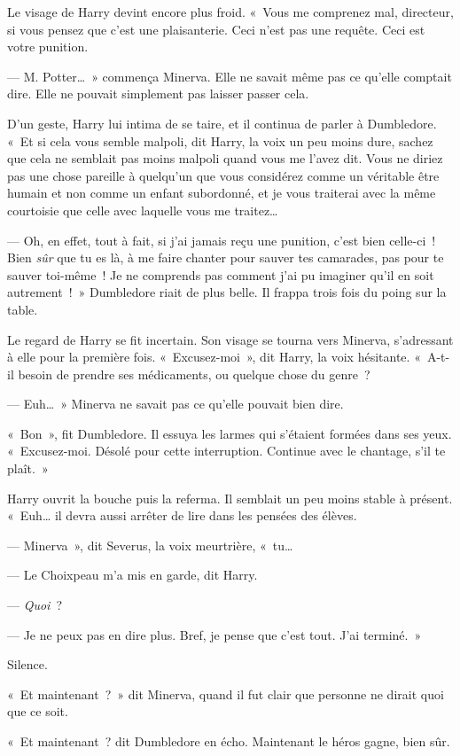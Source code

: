 Le visage de Harry devint encore plus froid.
«~Vous me comprenez mal, directeur, si vous pensez que c'est une plaisanterie.
Ceci n'est pas une requête.
Ceci est votre punition.

--- M. Potter…~»
commença Minerva.
Elle ne savait même pas ce qu'elle comptait dire.
Elle ne pouvait simplement pas laisser passer cela.

D'un geste, Harry lui intima de se taire, et il continua de parler à Dumbledore.
«~Et si cela vous semble malpoli, dit Harry, la voix un peu moins dure, sachez que cela ne semblait pas moins malpoli quand vous me l'avez dit.
Vous ne diriez pas une chose pareille à quelqu'un que vous considérez comme un véritable être humain et non comme un enfant subordonné, et je vous traiterai avec la même courtoisie que celle avec laquelle vous me traitez…

--- Oh, en effet, tout à fait, si j'ai jamais reçu une punition, c'est bien celle-ci~!
Bien \emph{sûr} que tu es là, à me faire chanter pour sauver tes camarades, pas pour te sauver toi-même~!
Je ne comprends pas comment j'ai pu imaginer qu'il en soit autrement~!~»
Dumbledore riait de plus belle.
Il frappa trois fois du poing sur la table.

Le regard de Harry se fit incertain.
Son visage se tourna vers Minerva, s'adressant à elle pour la première fois.
«~Excusez-moi~», dit Harry, la voix hésitante.
«~A-t-il besoin de prendre ses médicaments, ou quelque chose du genre~?

--- Euh…~» Minerva ne savait pas ce qu'elle pouvait bien dire.

«~Bon~», fit Dumbledore.
Il essuya les larmes qui s'étaient formées dans ses yeux.
«~Excusez-moi.
Désolé pour cette interruption.
Continue avec le chantage, s'il te plaît.~»

Harry ouvrit la bouche puis la referma.
Il semblait un peu moins stable à présent.
«~Euh… il devra aussi arrêter de lire dans les pensées des élèves.

--- Minerva~», dit Severus, la voix meurtrière, «~tu…

--- Le Choixpeau m'a mis en garde, dit Harry.

--- \emph{Quoi}~?

--- Je ne peux pas en dire plus.
Bref, je pense que c'est tout.
J'ai terminé.~»

Silence.

«~Et maintenant~?~» dit Minerva, quand il fut clair que personne ne dirait quoi que ce soit.

«~Et maintenant~? dit Dumbledore en écho.
Maintenant le héros gagne, bien sûr.

